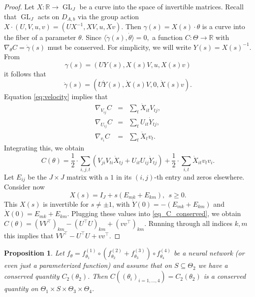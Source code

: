 \documentclass{article}
\newtheorem{prop}[theorem]{Proposition}
\theoremstyle{definition}
\newcommand{\R}{\mathbb{R}}
\DeclareMathOperator{\GL}{GL}
\begin{document}
\begin{proof} 
  Let $X:\R\rightarrow\GL_J$ be a curve into the space of invertible matrices. Recall that $\GL_J$ acts on $D_{A,b}$ via the group action $X\cdot(U,V,u,v)=(UX^{-1},XV,u,Xv)$. 
  Then $\gamma(s)=X(s)\cdot\theta$ is a curve into the fiber of a parameter $\theta$. 
  Since $\langle\dot{\gamma}(s),\dot{\theta}\rangle=0,$ a function $C:\Theta\rightarrow\R$ with $\nabla_\theta C=\dot{\gamma}(s)$ must be conserved. 
  For simplicity, we will write $Y(s)=X(s)^{-1}$. 
From \begin{equation}
    \gamma(s)=(UY(s),X(s)V,u,X(s)v)
\end{equation}
it follows that
\begin{equation}
    \dot{\gamma}(s)=(U\dot{Y}(s),\dot{X}(s)V,0,\dot{X}(s)v).
    \label{eq:velocity}
\end{equation}
Equation \ref{eq:velocity} implies that 
\begin{eqnarray*}
    \nabla_{V_{ij}}C&=&\sum_t\dot{X}_{it}V_{tj},\\
\nabla_{U_{ij}}C&=&\sum_tU_{it}\dot{Y}_{tj},\\
\nabla_{v_i}C&=&\sum_t\dot{X}_t v_t.
\end{eqnarray*}
Integrating this, we obtain 
\begin{equation}
\label{eq_C_conserved}
C(\theta)=\frac{1}{2}\cdot\sum_{i,j,t}\left(V_{ji}V_{ti}\dot{X}_{tj}+U_{it}U_{ij}\dot{Y}_{tj}\right)+\frac{1}{2}\cdot\sum_{i,t}\dot{X}_{it}v_tv_i.
\end{equation}
Let $E_{ij}$ be the $J\times J$ matrix with a $1$ in its $(i,j)$-th entry and zeros elsewhere. 
Consider now 
$$
X(s)=I_J+s(E_{mk}+E_{km}), \ \ s\geq0.
$$ 
This $X(s)$ is invertible for $s\neq\pm1$, with $\dot{Y}(0)=-(E_{mk}+E_{km})$ and $\dot{X}(0)=E_{mk}+E_{km}$. 
Plugging these values into \eqref{eq_C_conserved}, we obtain 
$C(\theta)=(VV^\top)_{km}-(U^\top U)_{km}+(vv^\top)_{km}$. 
Running through all indices $k,m$ this implies that $VV^\top-U^\top U+vv^\top$.  
\end{proof}

\begin{prop}
    Let $f_\theta = f^{(1)}_{\theta_1} \circ (f^{(2)}_{\theta_2} + f^{(3)}_{\theta_3}) \circ f^{(4)}_{\theta_4}$ be a neural network (or even just a parameterized function) and assume that on $S \subseteq \Theta_2$ we have a conserved quantity $C_2(\theta_2)$. Then $C((\theta_i)_{i=1,\ldots,4}) = C_2(\theta_2)$ is a conserved quantity on $\Theta_1 \times S \times \Theta_3 \times \Theta _4$.
\end{prop}
\end{document}
